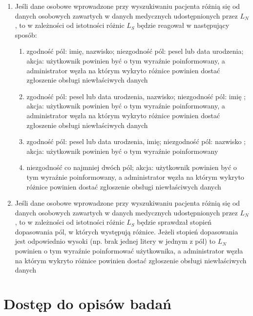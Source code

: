 \documentclass[a4paper]{report}
\begin{document}
\begin{enumerate}
  \item Jeśli dane osobowe wprowadzone przy wyszukiwaniu pacjenta różnią się od danych osobowych zawartych w danych medycznych udostępnionych przez $L_N$, to w zależności od istotności różnic $L_S$ będzie reagował w następujący sposób:
   \begin{enumerate}
      \item zgodność pól: imię, nazwisko; niezgodność pól: pesel lub data urodzenia; akcja: użytkownik powinien być o tym wyraźnie poinformowany, a administrator węzła na którym wykryto różnice powinien dostać zgłoszenie obsługi niewłaściwych danych
      \item zgodność pól: pesel lub data urodzenia, nazwisko; niezgodność pól: imię ; akcja: użytkownik powinien być o tym wyraźnie poinformowany, a administrator węzła na którym wykryto różnice powinien dostać zgłoszenie obsługi niewłaściwych danych
      \item zgodność pól: pesel lub data urodzenia, imię; niezgodność pól: nazwisko ; akcja: użytkownik powinien być o tym wyraźnie poinformowany
      \item niezgodność co najmniej dwóch pól; akcja: użytkownik powinien być o tym wyraźnie poinformowany, a administrator węzła na którym wykryto różnice powinien dostać zgłoszenie obsługi niewłaściwych danych
   \end{enumerate}
  \item Jeśli dane osobowe wprowadzone przy wyszukiwaniu pacjenta różnią się od danych osobowych zawartych w danych medycznych udostępnionych przez $L_N$, to w zależności od istotności różnic $L_S$ będzie sprawdzał stopień dopasowania pól, w których występują różnice. Jeżeli stopień dopasowania jest odpowiednio wysoki (np. brak jednej litery w jednym z pól) to $L_N$ powinien o tym wyraźnie poinformować użytkownika, a administrator węzła na którym wykryto różnice powinien dostać zgłoszenie obsługi niewłaściwych danych 
\end{enumerate}

\section{Dostęp do opisów badań}
\end{document}
